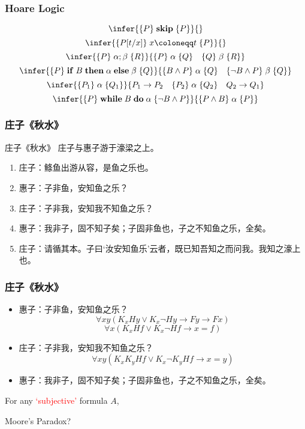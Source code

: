 \documentclass[UTF8,aspectratio=43,11pt,colorlinks,compress,openany]{beamer}%
\begin{document}
\begin{frame}\frametitle{Hoare Logic}
\[\infer{\{P\} \;\mathbf{skip}\; \{P\}}{}\]
\[\infer{\{P[t/x]\}\; x\coloneqq t\; \{P\}}{}\]
\[\infer{\{P\}\; \alpha;\beta\; \{R\}}{\{P\}\;\alpha\;\{Q\}\quad\{Q\}\;\beta\;\{R\}}\]
\[\infer{\{P\} \;\mathbf{if}\; B \;\mathbf{then}\; \alpha \;\mathbf{else}\; \beta\; \{Q\}}{\{B\wedge P\}\;\alpha\;\{Q\}\quad\{\neg B\wedge P\}\;\beta\;\{Q\}}\]
\[\infer{\{P_1\}\;\alpha\;\{Q_1\}}{P_1\to P_2\quad \{P_2\}\;\alpha\;\{Q_2\}\quad Q_2\to Q_1}\]
\[\infer{\{P\} \;\mathbf{while}\; B \;\mathbf{do}\; \alpha\; \{\neg B\wedge P\}}{\{P\wedge B\}\; \alpha\; \{P\}}\]
\end{frame}

\begin{frame}\frametitle{庄子《秋水》}
\begin{block}{庄子《秋水》}
庄子与惠子游于濠梁之上。
\begin{enumerate}
		\item 庄子：鲦鱼出游从容，是鱼之乐也。
		\item 惠子：子非鱼，安知鱼之乐？
		\item 庄子：子非我，安知我不知鱼之乐？
		\item 惠子：我非子，固不知子矣；子固非鱼也，子之不知鱼之乐，全矣。
		\item 庄子：请循其本。子曰‘汝安知鱼乐’云者，既已知吾知之而问我。我知之濠上也。
\end{enumerate}
\end{block}
\end{frame}

\begin{frame}\frametitle{庄子《秋水》}
\begin{itemize}
\item 惠子：子非鱼，安知鱼之乐？
\[\forall xy(K_xHy\vee K_x\neg Hy\to Fy\to Fx)\]
\[\forall x(K_xHf\vee K_x\neg Hf\to x=f)\]
\item 庄子：子非我，安知我不知鱼之乐？
\[\forall xy(K_x K_yHf\vee K_x\neg K_y Hf\to x=y)\]
\item 惠子：我非子，固不知子矣；子固非鱼也，子之不知鱼之乐，全矣。
\end{itemize}
\begin{block}{}
For any \textcolor{red}{`subjective'} formula $A$,\\
\centerline{\hfill Moore's Paradox?}
\end{block}
\end{frame}
\end{document}
